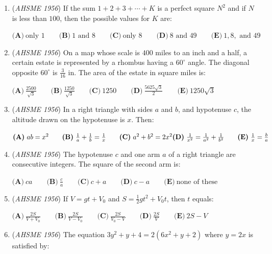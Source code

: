 \begin{enumerate}
 $\textbf{(A)}\ 128\qquad \textbf{(B)}\ 128\sqrt{3}\qquad \textbf{(C)}\ 256\qquad \textbf{(D)}\ 512\qquad \textbf{(E)}\ 512\sqrt{3}$


	\item (\textit{AHSME 1956}) If the sum $1 + 2 + 3 + \cdots + K$ is a perfect square $N^2$ and if $N$ is less than $100$, then the possible values for $K$ are: 


 $\textbf{(A)}\ \text{only }1\qquad \textbf{(B)}\ 1\text{ and }8\qquad \textbf{(C)}\ \text{only }8\qquad \textbf{(D)}\ 8\text{ and }49\qquad \textbf{(E)}\ 1,8,\text{ and }49$


	\item (\textit{AHSME 1956}) On a map whose scale is $400$ miles to an inch and a half, a certain estate is represented by a 
rhombus having a $60^{\circ}$ angle. The diagonal opposite $60^{\circ}$ is $\frac {3}{16}$ in. The area of the estate in square miles is: 


 $\textbf{(A)}\ \frac{2500}{\sqrt{3}}\qquad \textbf{(B)}\ \frac{1250}{\sqrt{3}}\qquad \textbf{(C)}\ 1250\qquad \textbf{(D)}\ \frac{5625\sqrt{3}}{2}\qquad \textbf{(E)}\ 1250\sqrt{3}$


	\item (\textit{AHSME 1956}) In a right triangle with sides $a$ and $b$, and hypotenuse $c$, the altitude drawn on the hypotenuse is $x$. Then: 


 $\textbf{(A)}\ ab = x^2 \qquad \textbf{(B)}\ \frac {1}{a} + \frac {1}{b} = \frac {1}{x} \qquad \textbf{(C)}\ a^2 + b^2 = 2x^2 \\ \textbf{(D)}\ \frac {1}{x^2} = \frac {1}{a^2} + \frac {1}{b^2} \qquad \textbf{(E)}\ \frac {1}{x} = \frac {b}{a}$


	\item (\textit{AHSME 1956}) The hypotenuse $c$ and one arm $a$ of a right triangle are consecutive integers. The square of the second arm is: 


 $\textbf{(A)}\ ca\qquad \textbf{(B)}\ \frac{c}{a}\qquad \textbf{(C)}\ c+a\qquad \textbf{(D)}\ c-a\qquad  \textbf{(E)}\ \text{none of these}$


	\item (\textit{AHSME 1956}) If $V = gt + V_0$ and $S = \frac {1}{2}gt^2 + V_0t$, then $t$ equals: 


 $\textbf{(A)}\ \frac{2S}{V+V_0}\qquad \textbf{(B)}\ \frac{2S}{V-V_0}\qquad \textbf{(C)}\ \frac{2S}{V_0-V}\qquad \textbf{(D)}\ \frac{2S}{V}\qquad \textbf{(E)}\ 2S-V$


	\item (\textit{AHSME 1956}) The equation $3y^2 + y + 4 = 2(6x^2 + y + 2)$ where $y = 2x$ is satisfied by: 



\end{enumerate}
